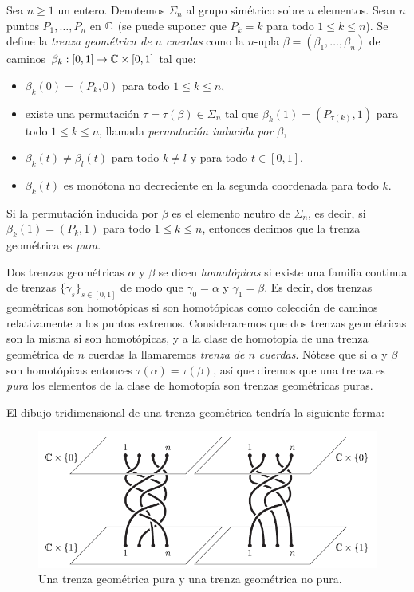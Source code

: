 \documentclass[TFG.tex]{subfiles}
\begin{document}
\begin{defi}\label{geo}
Sea $n\geq 1$ un entero. Denotemos $\Sigma_n$ al grupo simétrico sobre $n$ elementos. Sean $n$ puntos $P_1,\dots, P_n$ en $\mathbb{C}$ (se puede suponer que $P_k=k$ para todo $1\leq k\leq n$). Se define la \emph{trenza geométrica de $n$ cuerdas} como la $n$-upla $\beta=(\beta_1,\dots,\beta_n)$ de caminos $\beta_k:[0,1]\to\mathbb{C}\times[0,1]$ tal que:
\begin{itemize}
\item $\beta_k(0)=(P_k,0)$ para todo $1\leq k\leq n$,
\item existe una permutación $\tau=\tau(\beta)\in\Sigma_n$ tal que $\beta_k(1)=(P_{\tau(k)},1)$ para todo $1\leq k\leq n$, llamada \emph{permutación inducida por $\beta$},
\item $\beta_k(t)\neq \beta_l(t)$ para todo $k\neq l$ y para todo $t\in[0,1]$.
\item $\beta_k(t)$ es monótona no decreciente en la segunda coordenada para todo $k$. 
\end{itemize}
Si la permutación inducida por $\beta$ es el elemento neutro de $\Sigma_n$, es decir, si $\beta_k(1)=(P_k,1)$ para todo $1\leq k\leq n$, entonces decimos que la trenza geométrica es \emph{pura}.

Dos trenzas geométricas $\alpha$ y $\beta$ se dicen \emph{homotópicas} si existe una familia continua de trenzas $\{\gamma_s\}_{s\in[0,1]}$ de modo que $\gamma_0=\alpha$ y $\gamma_1=\beta$. Es decir, dos trenzas geométricas son homotópicas si son homotópicas como colección de caminos relativamente a los puntos extremos. Consideraremos que dos trenzas geométricas son la misma si son homotópicas, y a la clase de homotopía de una trenza geométrica de $n$ cuerdas la llamaremos \emph{trenza de $n$ cuerdas}. Nótese que si $\alpha$ y $\beta$ son homotópicas entonces $\tau(\alpha)=\tau(\beta)$, así que diremos que una trenza es \emph{pura} los elementos de la clase de homotopía son trenzas geométricas puras.
\end{defi}

El dibujo tridimensional de una trenza geométrica tendría la siguiente forma:
\begin{figure}[h!]
\includegraphics[scale=0.7]{Imagenes/hilos}
\caption{Una trenza geométrica pura y una trenza geométrica no pura.}\label{hilos}
\end{figure}
\end{document}
